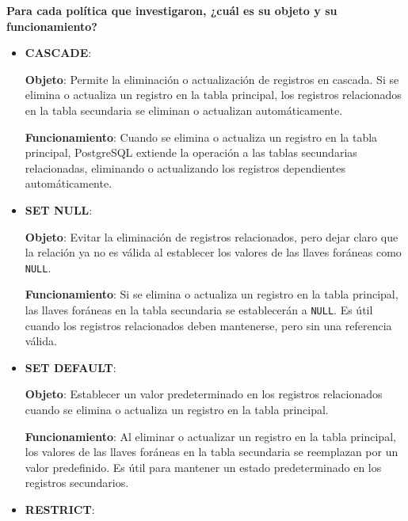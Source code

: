 \begin{center}
    \textbf{Para cada política que investigaron, ¿cuál es su objeto y su funcionamiento?}
\end{center}

\begin{itemize}
    \item \textbf{CASCADE}: 

    \textbf{Objeto}: Permite la eliminación o actualización de registros en cascada. Si se elimina o actualiza un registro en la tabla principal, los registros relacionados en la tabla secundaria se eliminan o actualizan automáticamente.
    
    \textbf{Funcionamiento}: Cuando se elimina o actualiza un registro en la tabla principal, PostgreSQL extiende la operación a las tablas secundarias relacionadas, eliminando o actualizando los registros dependientes automáticamente.
    
    \vspace{0.5cm}
    
    \item \textbf{SET NULL}: 
    
    \textbf{Objeto}: Evitar la eliminación de registros relacionados, pero dejar claro que la relación ya no es válida al establecer los valores de las llaves foráneas como \texttt{NULL}.
    
    \textbf{Funcionamiento}: Si se elimina o actualiza un registro en la tabla principal, las llaves foráneas en la tabla secundaria se establecerán a \texttt{NULL}. Es útil cuando los registros relacionados deben mantenerse, pero sin una referencia válida.
    
    \vspace{0.5cm}
    
    \item \textbf{SET DEFAULT}: 
    
    \textbf{Objeto}: Establecer un valor predeterminado en los registros relacionados cuando se elimina o actualiza un registro en la tabla principal.
    
    \textbf{Funcionamiento}: Al eliminar o actualizar un registro en la tabla principal, los valores de las llaves foráneas en la tabla secundaria se reemplazan por un valor predefinido. Es útil para mantener un estado predeterminado en los registros secundarios.
    
    \vspace{0.5cm}
    
    \item \textbf{RESTRICT}: 
    

\end{itemize}
